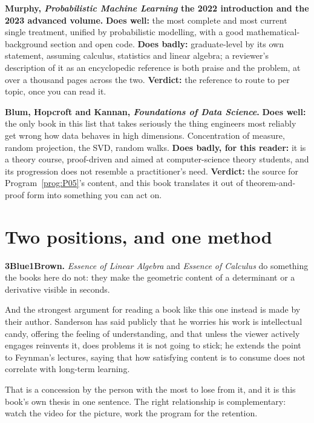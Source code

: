 \medskip
\textbf{Murphy, \emph{Probabilistic Machine Learning} \dash{} the 2022
introduction and the 2023 advanced volume.}
\textbf{Does well:} the most complete and most current single treatment, unified
by probabilistic modelling, with a good mathematical-background section and open
code. \textbf{Does badly:} graduate-level by its own statement, assuming
calculus, statistics and linear algebra; a reviewer's description of it as an
encyclopedic reference is both praise and the problem, at over a thousand pages
across the two.
\textbf{Verdict:} the reference to route to per topic, once you can read it.

\medskip
\textbf{Blum, Hopcroft and Kannan, \emph{Foundations of Data Science}.}
\textbf{Does well:} the only book in this list that takes seriously the thing
engineers most reliably get wrong \dash{} how data behaves in high dimensions.
Concentration of measure, random projection, the SVD, random walks.
\textbf{Does badly, for this reader:} it is a theory course, proof-driven and
aimed at computer-science theory students, and its progression does not
resemble a practitioner's need.
\textbf{Verdict:} the source for Program~\ref{prog:P05}'s content, and this book
translates it out of theorem-and-proof form into something you can act on.

\section{Two positions, and one method}
\label{sec:E-positions}

\medskip
\textbf{3Blue1Brown.} \emph{Essence of Linear Algebra} and \emph{Essence of
Calculus} do something the books here do not: they make the geometric content
of a determinant or a derivative visible in seconds.

And the strongest argument for reading a book like this one instead is made by
their author. Sanderson has said publicly that he worries his work is
intellectual candy, offering the feeling of understanding, and that unless the
viewer actively engages \dash{} reinvents it, does problems \dash{} it is not
going to stick; he extends the point to Feynman's lectures, saying that how
satisfying content is to consume does not correlate with long-term learning.

That is a concession by the person with the most to lose from it, and it is
this book's own thesis in one sentence. The right relationship is complementary:
watch the video for the picture, work the program for the retention.


